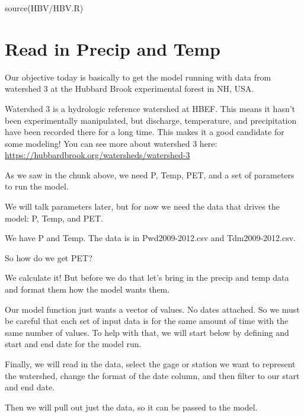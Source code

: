 \documentclass[
]{book}
\newenvironment{Shaded}{\begin{snugshade}}{\end{snugshade}}
\newcommand{\FunctionTok}[1]{\textcolor[rgb]{0.00,0.00,0.00}{#1}}
\newcommand{\NormalTok}[1]{#1}
\newcommand{\StringTok}[1]{\textcolor[rgb]{0.31,0.60,0.02}{#1}}
\begin{document}
\begin{Shaded}
\begin{Highlighting}[]
\FunctionTok{source}\NormalTok{(}\StringTok{\textquotesingle{}HBV/HBV.R\textquotesingle{}}\NormalTok{)}
\end{Highlighting}
\end{Shaded}

\hypertarget{read-in-precip-and-temp}{%
\section{Read in Precip and Temp}\label{read-in-precip-and-temp}}

Our objective today is basically to get the model running with data from watershed 3 at the Hubbard Brook experimental forest in NH, USA.

Watershed 3 is a hydrologic reference watershed at HBEF. This means it hasn't been experimentally manipulated, but discharge, temperature, and precipitation have been recorded there for a long time. This makes it a good candidate for some modeling! You can see more about watershed 3 here: \url{https://hubbardbrook.org/watersheds/watershed-3}

As we saw in the chunk above, we need P, Temp, PET, and a set of parameters to run the model.

We will talk parameters later, but for now we need the data that drives the model: P, Temp, and PET.

We have P and Temp. The data is in Pwd2009-2012.csv and Tdm2009-2012.csv.

So how do we get PET?

We calculate it! But before we do that let's bring in the precip and temp data and format them how the model wants them.

Our model function just wants a vector of values. No dates attached. So we must be careful that each set of input data is for the same amount of time with the same number of values. To help with that, we will start below by defining and start and end date for the model run.

Finally, we will read in the data, select the gage or station we want to represent the watershed, change the format of the date column, and then filter to our start and end date.

Then we will pull out just the data, so it can be passed to the model.
\end{document}
